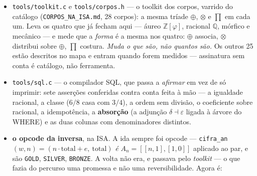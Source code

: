 \documentclass[11pt]{article}
\newcommand{\code}[1]{\texttt{\small #1}}
\newcommand{\Z}{\mathbb Z}
\newcommand{\Q}{\mathbb Q}
\theoremstyle{plain}
\theoremstyle{remark}
\begin{document}
\begin{itemize}
\begin{verbatim}
 régua do PREFIXO concorda em 6100 (61%)
 régua do VENOM concorda em 5814 (58%)
\end{verbatim}

\textbf{Perdeu --- e na referência escolhida a seu favor.} A versão anterior tinha previsto o contrário. A razão:
\code{'casa'} vs \code{'vasa'} (Hamming $1$) e \code{'casa'} vs \code{'peso'} (Hamming $3$) dão
\emph{ambos} venom $3$. A curva junta o que Hamming separa --- é a costura, a mesma já dita no
\code{tesseracto.c}: pontos vizinhos no cubo podem cair longe na reta.

E há um preço que fica dito: o venom lê um \textbf{número fixo} de posições --- o hipercubo tem os
eixos que tem. A régua do prefixo não tem esse limite: o texto acaba onde quiser. \emph{Trocar de
régua seria trocar a régua infinita por uma de comprimento fixo}, e isso não é de graça.

Logo não substituo a régua do prefixo pelo venom --- \textbf{e agora com número, não com gosto}. O
venom fica no catálogo como corpo, que é onde ele é bom; medir strings não é o ofício dele.

\textbf{Não há régua de corpos separada da régua de textos: há uma, e ela não sabe o que está a
medir.}

\textbf{E as duas coisas são uma só.} A distância entre duas entradas é $1/2^k$ com $k$ o prefixo
comum; o índice guarda-as partilhando exatamente esses $k$ nós. \emph{A régua e o índice não são
duas estruturas --- são a mesma, lida de dois lados.} Descer o caminho \textbf{é} medir a
distância.
\item \code{tools/toolkit.c} e \code{tools/corpos.h} --- o toolkit dos corpos, varrido do
catálogo (\code{CORPOS\_NA\_ISA.md}, 28 corpos): a mesma tríade $\oplus$, $\otimes$ e $\prod$ em cada
um. Leva os quatro que já fecham aqui --- áureo $\Z[\varphi]$, racional $\Q$, mórfico e mecânico
--- e mede que a \emph{forma} é a mesma nos quatro: $\oplus$ associa, $\otimes$ distribui sobre
$\oplus$, $\prod$ costura. \emph{Muda o que são, não quantos são.} Os outros 25 estão descritos
no mapa e entram quando forem medidos --- assinatura sem conta é catálogo, não ferramenta.
\item \code{tools/sql.c} --- o compilador SQL, que passa a \emph{afirmar} em vez de só imprimir:
sete asserções conferidas contra conta feita à mão --- a igualdade racional, a classe ($6/8$ casa
com $3/4$), a ordem sem divisão, o coeficiente sobre racional, a idempotência, a \textbf{absorção}
(a adjunção $\delta\dashv\varepsilon$ ligada à árvore do WHERE) e as duas colunas com denominadores
distintos.
\item \textbf{o opcode da inversa}, na ISA. A ida sempre foi opcode --- \code{cifra\_an}$(w,n)
= (n\cdot\text{total} + e,\ \text{total})$ \emph{é} $A_n = [[n,1],[1,0]]$ aplicado ao par, e são
\code{GOLD}, \code{SILVER}, \code{BRONZE}. A volta não era, e passava pelo \emph{toolkit} --- o
que fazia do percurso uma promessa e não uma reversibilidade. Agora é:


\end{itemize}
\end{document}
